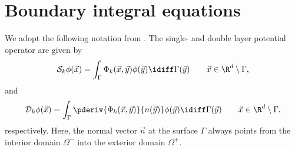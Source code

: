 \section{Boundary integral equations}
\label{Sec3:BIE}
We adopt the following notation from \cite{Chandler_Wilde2012nab}. The single- and double layer potential operator are given by
\begin{equation*}
	\mathcal{S}_k \phi(\vec{x}) = \int_\Gamma \Phi_k(\vec{x},\vec{y}) \phi(\vec{y}) \idiff\Gamma(\vec{y})\qquad \vec{x}\in\R^d\setminus\Gamma,
\end{equation*}
and
\begin{equation*}
	\mathcal{D}_k \phi(\vec{x}) = \int_\Gamma \pderiv{\Phi_k(\vec{x},\vec{y})}{n(\vec{y})} \phi(\vec{y}) \idiff\Gamma(\vec{y})\qquad \vec{x}\in\R^d\setminus\Gamma,
\end{equation*}
respectively. Here, the normal vector $\vec{n}$ at the surface $\Gamma$ always points from the interior domain $\Omega^-$ into the exterior domain $\Omega^+$.

